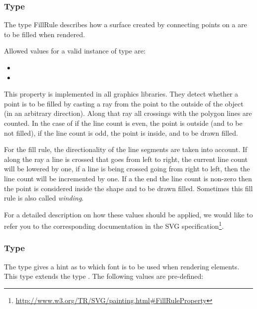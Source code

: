 \subsubsection{Type \fixttspace{}}

The type FillRule describes how a surface created by connecting 
points on a \Polygon are to be filled when rendered. 

Allowed values for a valid instance of type  are:

\begin{itemize}
 \item {} 
 \item {}
\end{itemize}

This property is implemented in all graphics libraries. They detect whether 
a point is to be filled by casting a ray from the point to the outside of the 
object (in an arbitrary direction). Along that ray all crossings with 
the polygon lines are counted. In the case of  if the line count 
is even, the point is outside (and to be not filled), if the line count is odd, 
the point is inside, and to be drawn filled. 

For the  fill rule, the directionality of the line segments are 
taken into account. If along the ray a line is crossed that goes from left to 
right, the current line count will be lowered by one, if a line is being crossed 
going from right to left, then the line count will be incremented by one. If a 
the end the line count is non-zero then the point is considered inside the shape 
and to be drawn filled. Sometimes this fill rule is also called \emph{winding}. 

For a detailed description on how these values should be applied, we would like 
to refer you to the corresponding documentation in the SVG specification\footnote{ \url{http://www.w3.org/TR/SVG/painting.html\#FillRuleProperty}}. 

\subsubsection{Type \fixttspace{}}

The \FontFamily type gives a hint as to which font is to be used when
rendering \Text elements. This type extends the type . The following values are pre-defined: 

